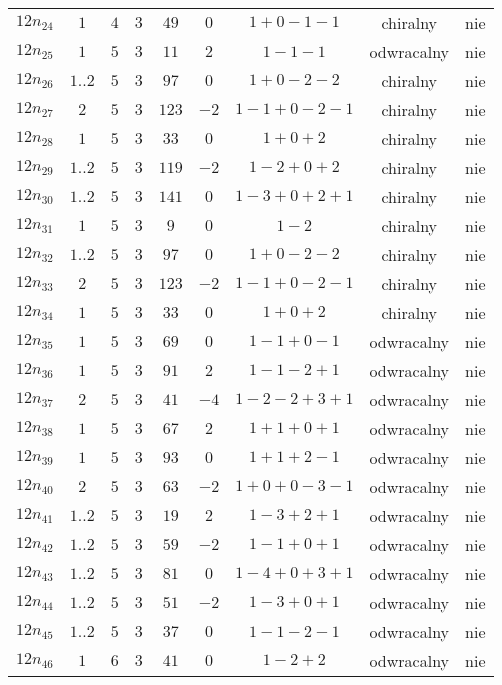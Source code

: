 \begin{longtable}{ccccccccc}
$12n_{24}$ & $1$ & $4$ & $3$ & $49$ & $0$ & $1+0-1-1$ & chiralny & nie \\
$12n_{25}$ & $1$ & $5$ & $3$ & $11$ & $2$ & $1-1-1$ & odwracalny & nie \\
$12n_{26}$ & $1..2$ & $5$ & $3$ & $97$ & $0$ & $1+0-2-2$ & chiralny & nie \\
$12n_{27}$ & $2$ & $5$ & $3$ & $123$ & $-2$ & $1-1+0-2-1$ & chiralny & nie \\
$12n_{28}$ & $1$ & $5$ & $3$ & $33$ & $0$ & $1+0+2$ & chiralny & nie \\
$12n_{29}$ & $1..2$ & $5$ & $3$ & $119$ & $-2$ & $1-2+0+2$ & chiralny & nie \\
$12n_{30}$ & $1..2$ & $5$ & $3$ & $141$ & $0$ & $1-3+0+2+1$ & chiralny & nie \\
$12n_{31}$ & $1$ & $5$ & $3$ & $9$ & $0$ & $1-2$ & chiralny & nie \\
$12n_{32}$ & $1..2$ & $5$ & $3$ & $97$ & $0$ & $1+0-2-2$ & chiralny & nie \\
$12n_{33}$ & $2$ & $5$ & $3$ & $123$ & $-2$ & $1-1+0-2-1$ & chiralny & nie \\
$12n_{34}$ & $1$ & $5$ & $3$ & $33$ & $0$ & $1+0+2$ & chiralny & nie \\
$12n_{35}$ & $1$ & $5$ & $3$ & $69$ & $0$ & $1-1+0-1$ & odwracalny & nie \\
$12n_{36}$ & $1$ & $5$ & $3$ & $91$ & $2$ & $1-1-2+1$ & odwracalny & nie \\
$12n_{37}$ & $2$ & $5$ & $3$ & $41$ & $-4$ & $1-2-2+3+1$ & odwracalny & nie \\
$12n_{38}$ & $1$ & $5$ & $3$ & $67$ & $2$ & $1+1+0+1$ & odwracalny & nie \\
$12n_{39}$ & $1$ & $5$ & $3$ & $93$ & $0$ & $1+1+2-1$ & odwracalny & nie \\
$12n_{40}$ & $2$ & $5$ & $3$ & $63$ & $-2$ & $1+0+0-3-1$ & odwracalny & nie \\
$12n_{41}$ & $1..2$ & $5$ & $3$ & $19$ & $2$ & $1-3+2+1$ & odwracalny & nie \\
$12n_{42}$ & $1..2$ & $5$ & $3$ & $59$ & $-2$ & $1-1+0+1$ & odwracalny & nie \\
$12n_{43}$ & $1..2$ & $5$ & $3$ & $81$ & $0$ & $1-4+0+3+1$ & odwracalny & nie \\
$12n_{44}$ & $1..2$ & $5$ & $3$ & $51$ & $-2$ & $1-3+0+1$ & odwracalny & nie \\
$12n_{45}$ & $1..2$ & $5$ & $3$ & $37$ & $0$ & $1-1-2-1$ & odwracalny & nie \\
$12n_{46}$ & $1$ & $6$ & $3$ & $41$ & $0$ & $1-2+2$ & odwracalny & nie \\

\end{longtable}
